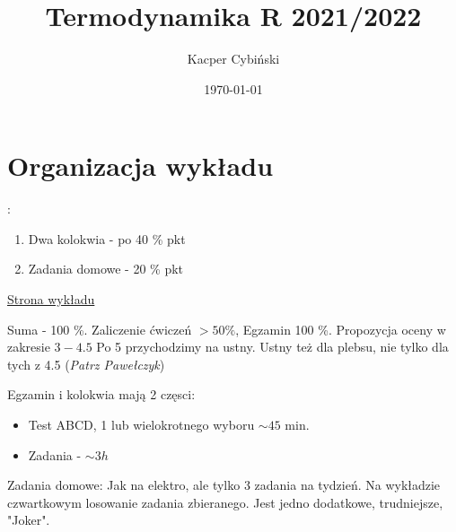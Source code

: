 \documentclass[12pt,a4paper]{report}
\title{Termodynamika R 2021/2022}
\author{Kacper Cybiński}
\date{\today}
\newcommand{\link}[2]{{\color{cyan} \href{#1}{#2}}}
\begin{document}
\maketitle


\chapter*{Organizacja wykładu}:
\begin{enumerate}
    \item Dwa kolokwia - po 40 \% pkt
    \item Zadania domowe - 20 \% pkt
\end{enumerate}

{\color{blue} \link{http://www.fuw.edu.pl/~piotrek/stat2022}{Strona wykładu}}

Suma - 100 \%. Zaliczenie ćwiczeń $> 50 \%$, Egzamin 100 \%. Propozycja oceny w zakresie $3-4.5$ Po 5 przychodzimy na ustny. Ustny też dla plebsu, nie tylko dla tych z 4.5 ({\it Patrz Pawełczyk})

Egzamin i kolokwia mają 2 częsci:
\begin{itemize}
\item Test ABCD, 1 lub wielokrotnego wyboru $\sim 45$ min.
\item Zadania - $\sim 3h$
\end{itemize}

Zadania domowe: Jak na elektro, ale tylko 3 zadania na tydzień. Na wykładzie czwartkowym losowanie zadania zbieranego. Jest jedno dodatkowe, trudniejsze, "Joker".
\end{document}
